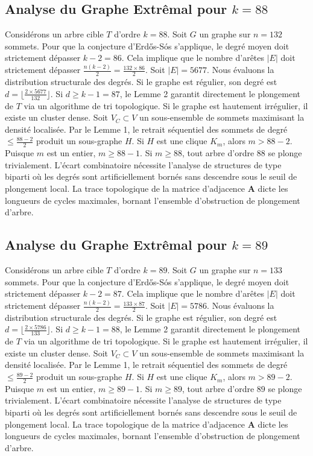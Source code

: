 \documentclass[11pt,a4paper]{article}
\begin{document}
\subsection{Analyse du Graphe Extr\^emal pour $k=88$}
Consid\'erons un arbre cible $T$ d'ordre $k=88$.
Soit $G$ un graphe sur $n=132$ sommets.
Pour que la conjecture d'Erd\H{o}s-S\'os s'applique, le degr\'e moyen doit strictement d\'epasser $k-2 = 86$.
Cela implique que le nombre d'ar\^etes $|E|$ doit strictement d\'epasser $\frac{n(k-2)}{2} = \frac{132 \times 86}{2}$.
Soit $|E| = 5677$.
Nous \'evaluons la distribution structurale des degr\'es. Si le graphe est r\'egulier, son degr\'e est $d = \lfloor \frac{2 \times 5677}{132} \rfloor$.
Si $d \geq k-1 = 87$, le Lemme 2 garantit directement le plongement de $T$ via un algorithme de tri topologique.
Si le graphe est hautement irr\'egulier, il existe un cluster dense. Soit $V_C \subset V$ un sous-ensemble de sommets maximisant la densit\'e localis\'ee.
Par le Lemme 1, le retrait s\'equentiel des sommets de degr\'e $\leq \frac{88-2}{2}$ produit un sous-graphe $H$.
Si $H$ est une clique $K_{m}$, alors $m > 88-2$. Puisque $m$ est un entier, $m \geq 88-1$. Si $m \geq 88$, tout arbre d'ordre $88$ se plonge trivialement.
L'\'ecart combinatoire n\'ecessite l'analyse de structures de type biparti o\`u les degr\'es sont artificiellement born\'es sans descendre sous le seuil de plongement local. La trace topologique de la matrice d'adjacence $\mathbf{A}$ dicte les longueurs de cycles maximales, bornant l'ensemble d'obstruction de plongement d'arbre.


\subsection{Analyse du Graphe Extr\^emal pour $k=89$}
Consid\'erons un arbre cible $T$ d'ordre $k=89$.
Soit $G$ un graphe sur $n=133$ sommets.
Pour que la conjecture d'Erd\H{o}s-S\'os s'applique, le degr\'e moyen doit strictement d\'epasser $k-2 = 87$.
Cela implique que le nombre d'ar\^etes $|E|$ doit strictement d\'epasser $\frac{n(k-2)}{2} = \frac{133 \times 87}{2}$.
Soit $|E| = 5786$.
Nous \'evaluons la distribution structurale des degr\'es. Si le graphe est r\'egulier, son degr\'e est $d = \lfloor \frac{2 \times 5786}{133} \rfloor$.
Si $d \geq k-1 = 88$, le Lemme 2 garantit directement le plongement de $T$ via un algorithme de tri topologique.
Si le graphe est hautement irr\'egulier, il existe un cluster dense. Soit $V_C \subset V$ un sous-ensemble de sommets maximisant la densit\'e localis\'ee.
Par le Lemme 1, le retrait s\'equentiel des sommets de degr\'e $\leq \frac{89-2}{2}$ produit un sous-graphe $H$.
Si $H$ est une clique $K_{m}$, alors $m > 89-2$. Puisque $m$ est un entier, $m \geq 89-1$. Si $m \geq 89$, tout arbre d'ordre $89$ se plonge trivialement.
L'\'ecart combinatoire n\'ecessite l'analyse de structures de type biparti o\`u les degr\'es sont artificiellement born\'es sans descendre sous le seuil de plongement local. La trace topologique de la matrice d'adjacence $\mathbf{A}$ dicte les longueurs de cycles maximales, bornant l'ensemble d'obstruction de plongement d'arbre.
\end{document}
